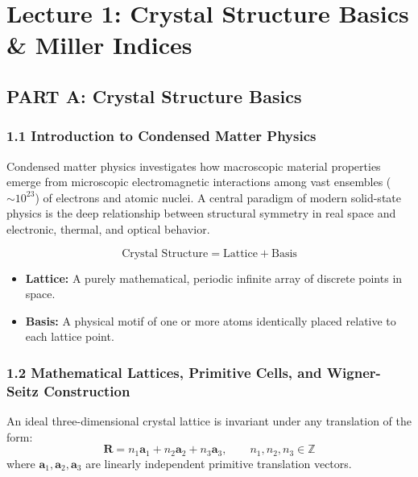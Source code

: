 \documentclass[11pt,a4paper]{article}
\begin{document}
\newpage

\section{Lecture 1: Crystal Structure Basics \& Miller Indices}

\subsection{PART A: Crystal Structure Basics}

\subsubsection{1.1 Introduction to Condensed Matter Physics}
Condensed matter physics investigates how macroscopic material properties emerge from microscopic electromagnetic interactions among vast ensembles ($\sim 10^{23}$) of electrons and atomic nuclei. A central paradigm of modern solid-state physics is the deep relationship between structural symmetry in real space and electronic, thermal, and optical behavior.

\begin{keybox}
$$\text{Crystal Structure} = \text{Lattice} + \text{Basis}$$
\begin{itemize}[leftmargin=1.5em]
    \item \textbf{Lattice:} A purely mathematical, periodic infinite array of discrete points in space.
    \item \textbf{Basis:} A physical motif of one or more atoms identically placed relative to each lattice point.
\end{itemize}
\end{keybox}

\subsubsection{1.2 Mathematical Lattices, Primitive Cells, and Wigner-Seitz Construction}
An ideal three-dimensional crystal lattice is invariant under any translation of the form:
\begin{equation}
\mathbf{R} = n_1\mathbf{a}_1 + n_2\mathbf{a}_2 + n_3\mathbf{a}_3, \qquad n_1, n_2, n_3 \in \mathbb{Z}
\end{equation}
where $\mathbf{a}_1, \mathbf{a}_2, \mathbf{a}_3$ are linearly independent primitive translation vectors.
\end{document}
